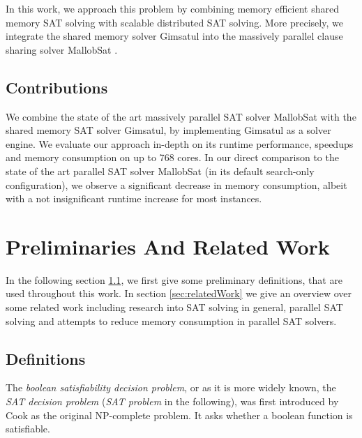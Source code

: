 \documentclass[12pt,a4paper,twoside]{scrartcl}
\numberwithin{equation}{section}
\begin{document}
In this work, we approach this problem by combining memory efficient shared memory SAT solving with scalable distributed SAT solving. More precisely, we integrate the shared memory solver Gimsatul \cite{gimsatul} into the massively parallel clause sharing solver MallobSat \cite{mallobSat}.

\subsection{Contributions}

We combine the state of the art massively parallel SAT solver MallobSat with the shared memory SAT solver Gimsatul, by implementing Gimsatul as a solver engine. We evaluate our approach in-depth on its runtime performance, speedups and memory consumption on up to 768 cores. In our direct comparison to the state of the art parallel SAT solver MallobSat (in its default search-only configuration), we observe a significant decrease in memory consumption, albeit with a not insignificant runtime increase for most instances.


\section{Preliminaries And Related Work}

In the following section \ref{sec:definitions}, we first give some preliminary definitions, that are used throughout this work. In section \ref{sec:relatedWork} we give an overview over some related work including research into SAT solving in general, parallel SAT solving and attempts to reduce memory consumption in parallel SAT solvers.

\subsection{Definitions}
\label{sec:definitions}

The \textit{boolean satisfiability decision problem}, or as it is more widely known, the \textit{SAT decision problem} (\textit{SAT problem} in the following), was first introduced by Cook \cite{satProblem} as the original NP-complete problem. It asks whether a boolean function is satisfiable.
\end{document}
